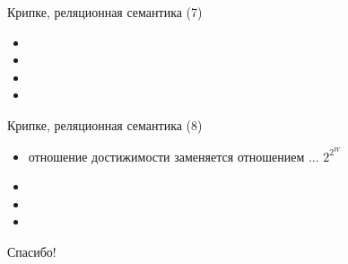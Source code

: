 \documentclass{beamer}
\begin{document}
\begin{frame}{Крипке, реляционная семантика (7)}
\begin{itemize}
  \item 
  \item 
  \item 
  \item 
\end{itemize}
\end{frame}

\begin{frame}{Крипке, реляционная семантика (8)}
\begin{itemize}
  \item отношение достижимости заменяется отношением ... $2^{2^W}$ 
  \item 
  \item 
  \item 
\end{itemize}
\end{frame}


\begin{frame}{}
    \thispagestyle{empty}
    \begin{center}
        {\large Спасибо!}
    \end{center}
\end{frame}


\end{document}
